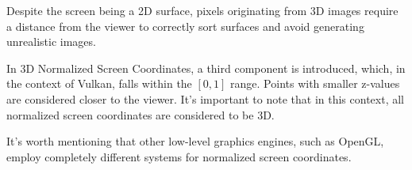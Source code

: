 Despite the screen being a 2D surface, pixels originating from 3D images require a distance from the viewer to correctly sort surfaces and avoid generating unrealistic images.

In 3D Normalized Screen Coordinates, a third component is introduced, which, in the context of Vulkan, falls within the $[0,1]$ range. 
Points with smaller z-values are considered closer to the viewer. 
It's important to note that in this context, all normalized screen coordinates are considered to be 3D.

It's worth mentioning that other low-level graphics engines, such as OpenGL, employ completely different systems for normalized screen coordinates.